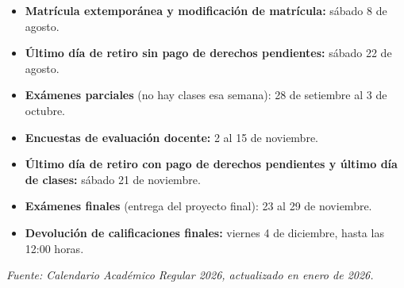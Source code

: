 \documentclass[11pt]{article}
\begin{document}
\begin{itemize}
\item \textbf{Matr\'icula extempor\'anea y modificaci\'on de matr\'icula:} s\'abado 8 de agosto.
\item \textbf{\'Ultimo d\'ia de retiro sin pago de derechos pendientes:} s\'abado 22 de agosto.
\item \textbf{Ex\'amenes parciales} (no hay clases esa semana): 28 de setiembre al 3 de octubre.
\item \textbf{Encuestas de evaluaci\'on docente:} 2 al 15 de noviembre.
\item \textbf{\'Ultimo d\'ia de retiro con pago de derechos pendientes y \'ultimo d\'ia de clases:} s\'abado 21 de noviembre.
\item \textbf{Ex\'amenes finales} (entrega del proyecto final): 23 al 29 de noviembre.
\item \textbf{Devoluci\'on de calificaciones finales:} viernes 4 de diciembre, hasta las 12:00 horas.
\end{itemize}

\emph{Fuente: Calendario Acad\'emico Regular 2026, actualizado en enero de 2026.}
\end{document}

